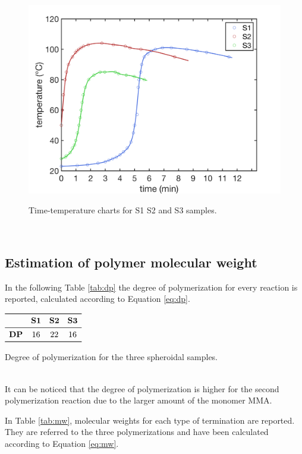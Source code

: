 \documentclass[a4paper, 11pt]{article}
\begin{document}
\begin{figure}[htp]
\centering
{\includegraphics[scale=0.35]{heatrelease}}
\captionsetup{justification=centering}
\caption{Time-temperature charts for S1 S2 and S3 samples.}
\label{fig:Tt}
\end{figure}\\

\newpage

\subsection{Estimation of polymer molecular weight}

In the following Table \ref{tab:dp} the degree of polymerization for every reaction is reported, calculated according to Equation \ref{eq:dp}.
\begin{table}[htp]
\centering
$
\begin{array}{cccc}
\toprule
& \textbf{S1} & \textbf{S2} & \textbf{S3}  \\
\midrule
\textbf{DP} & 16 & 22 & 16 \\
\bottomrule
\end{array}
$
\caption{Degree of polymerization for the three spheroidal samples.}
\label{tab:dp}
\end{table}\\
It can be noticed that the degree of polymerization is higher for the second polymerization reaction due to the larger amount of the monomer MMA.

In Table \ref{tab:mw}, molecular weights for each type of termination are reported. They are referred to the three polymerizations and have been calculated according to Equation \ref{eq:mw}.
\end{document}
